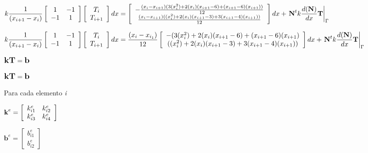 \documentclass[12pt]{report}
\begin{document}
\begin{center}
            $\displaystyle k \frac{1}{(x_{i+1}-x_i)} \left[ \begin{array}{c c} 1 & -1 \\ -1 & 1\end{array} \right] \left[ \begin{array}{c} T_i \\ T_{i+1} \end{array} \right] dx =  \left[ \begin{array}{c} - \frac{(x_i-x_{i+1})(3(x^{2}_{i})+2(x_i)(x_{i+1}-6)+(x_{i+1}-6)(x_{i+1}))}{12} \\ \frac{(x_i-x_{i+1})((x^{2}_{i})+2(x_i)(x_{i+1}-3)+3(x_{i+1}-4)(x_{i+1}))}{12} \end{array} \right] dx +  \left. \textbf{N}^t  k \frac{d(\textbf{N})}{dx} \textbf{T} \right|_{\Gamma}$

            $\displaystyle k \frac{1}{(x_{i+1}-x_i)} \left[ \begin{array}{c c} 1 & -1 \\ -1 & 1\end{array} \right] \left[ \begin{array}{c} T_i \\ T_{i+1} \end{array} \right] dx =  \frac{(x_i-x_{i_1})}{12} \left[ \begin{array}{c} - (3(x^{2}_{i})+2(x_i)(x_{i+1}-6)+(x_{i+1}-6)(x_{i+1}) \\ ((x^{2}_{i})+2(x_i)(x_{i+1}-3)+3(x_{i+1}-4)(x_{i+1})) \end{array} \right] dx +  \left. \textbf{N}^t  k \frac{d(\textbf{N})}{dx} \textbf{T} \right|_{\Gamma}$
        \end{center}

        $\displaystyle \large \textbf{k} \textbf{T} = \textbf{b}$

        \newpage

        $\displaystyle \large \textbf{k} \textbf{T} = \textbf{b}$

        Para cada elemento \textit{i}

        \begin{center}
            $\displaystyle \textbf{k}^e = \left[ \begin{array}{c c} k_{i1}^{e} & k_{i2}^{e} \\ k_{i 3}^{e} & k_{i 4}^{e} \end{array} \right]$

            $\displaystyle \textbf{b}^e = \left[ \begin{array}{c} b_{i1}^{e} \\ b_{i2}^{e} \end{array} \right]$
        \end{center}
\end{document}
